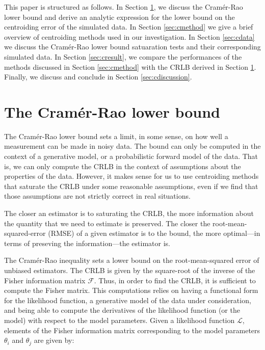 This paper is structured as follows. In Section \ref{sec:cCRLB},
we discuss the Cram\'{e}r-Rao lower bound and derive
an analytic expression for the lower bound on the centroiding error
of the simulated data. 
In Section \ref{sec:cmethod} we give a brief overview of 
centroiding methods used in our investigation.
In Section \ref{sec:cdata} we discuss the Cram\'{e}r-Rao lower bound satuaration
tests and their corresponding simulated data.
In Section \ref{sec:cresult}, we compare the performances of the methods
discussed in Section \ref{sec:cmethod} with the CRLB derived in Section \ref{sec:cCRLB}. Finally, we discuss and conclude in Section \ref{sec:cdiscussion}.               
              

\section{The Cram\'{e}r-Rao lower bound}\label{sec:cCRLB}

The Cram\'{e}r-Rao lower bound sets a limit, in some sense, on how well a measurement 
can be made in noisy data.  The bound can only be computed in the context of a 
generative model, or a probabilistic forward model of the data. That is, we can 
only compute the CRLB in the context of assumptions about the properties of the data. 
However, it makes sense for us to use centroiding methods that saturate the CRLB under 
some reasonable assumptions, even if we find that those assumptions are not strictly correct in real situations.

The closer an estimator is to saturating the CRLB, the more information about the quantity that we 
need to estimate is preserved. The closer the root-mean-squared-error (RMSE) of a given estimator is to the bound,  
the more optimal---in terms of preseving the information---the estimator is. 

The Cram\'{e}r-Rao inequality \citep{crlb} sets a lower bound on the 
root-mean-squared error of unbiased estimators. The CRLB is given by the square-root of the inverse of 
the Fisher information matrix $\mathcal{F}$. Thus, in order to find the CRLB, it is sufficient to compute the Fisher matrix. 
This computations relies on having a functional form for the likelihood function, a generative model of the data under consideration, and 
being able to compute the derivatives of the likelihood function (or the model) with respect to the model parameters. 
Given a likelihood function $\mathcal{L}$, elements of the Fisher information matrix corresponding to the model parameters $\theta_i$ and $\theta_j$ 
are given by:

